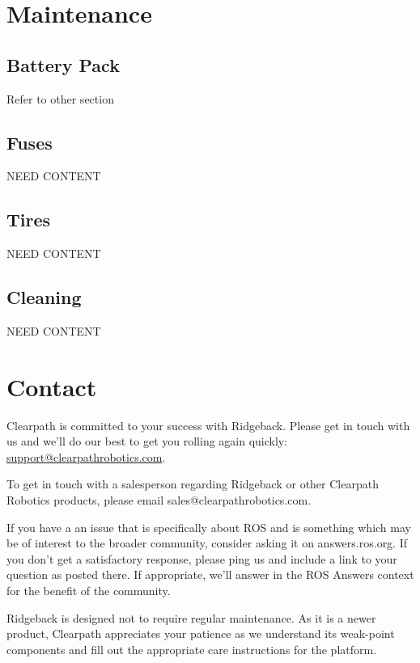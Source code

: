 \documentclass[]{clearpath-latex/clearpath-manual}
\begin{document}
\section{Maintenance}

\subsection{Battery Pack}

Refer to other section

\subsection{Fuses}

NEED CONTENT

\subsection{Tires}

NEED CONTENT

\subsection{Cleaning}

NEED CONTENT

\section{Contact}
\label{contact}

Clearpath is committed to your success with Ridgeback. Please get in touch with us and we’ll do our best to get
you rolling again quickly: \url{support@clearpathrobotics.com}.

To get in touch with a salesperson regarding Ridgeback or other Clearpath Robotics products, please email
sales@clearpathrobotics.com.

If you have a an issue that is specifically about ROS and is something which may be of interest to the broader
community, consider asking it on answers.ros.org. If you don’t get a satisfactory response, please ping us and
include a link to your question as posted there. If appropriate, we’ll answer in the ROS Answers context for
the benefit of the community.

Ridgeback is designed not to require regular maintenance. As it is a newer product, Clearpath appreciates your
patience as we understand its weak-point components and fill out the appropriate care instructions for the
platform.
\end{document}

